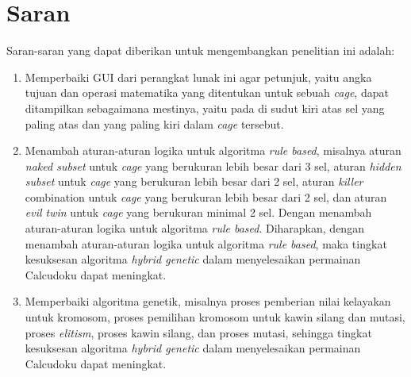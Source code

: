 \section{Saran}
\label{sec:saran}

Saran-saran yang dapat diberikan untuk mengembangkan penelitian ini adalah:

\begin{enumerate}
\item Memperbaiki GUI dari perangkat lunak ini agar petunjuk, yaitu angka tujuan dan operasi matematika yang ditentukan untuk sebuah \textit{cage}, dapat ditampilkan sebagaimana mestinya, yaitu pada di sudut kiri atas sel yang paling atas dan yang paling kiri dalam \textit{cage} tersebut.
\item Menambah aturan-aturan logika untuk algoritma \textit{rule based}, misalnya aturan \textit{naked subset} untuk \textit{cage} yang berukuran lebih besar dari 3 sel, aturan \textit{hidden subset} untuk \textit{cage} yang berukuran lebih besar dari 2 sel, aturan \textit{killer} combination untuk \textit{cage} yang berukuran lebih besar dari 2 sel, dan aturan \textit{evil twin} untuk \textit{cage} yang berukuran minimal 2 sel. Dengan menambah aturan-aturan logika untuk algoritma \textit{rule based}. Diharapkan, dengan menambah aturan-aturan logika untuk algoritma \textit{rule based}, maka tingkat kesuksesan algoritma \textit{hybrid genetic} dalam menyelesaikan permainan Calcudoku dapat meningkat.
\item Memperbaiki algoritma genetik, misalnya proses pemberian nilai kelayakan untuk kromosom, proses pemilihan kromosom untuk kawin silang dan mutasi, proses \textit{elitism}, proses kawin silang, dan proses mutasi, sehingga tingkat kesuksesan algoritma \textit{hybrid genetic} dalam menyelesaikan permainan Calcudoku dapat meningkat.
\end{enumerate}